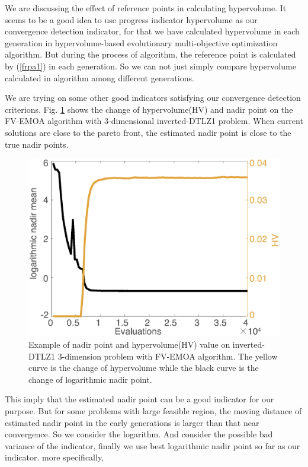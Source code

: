 \documentclass[conference]{IEEEtran}
\begin{document}
We are discussing the effect of reference points in calculating hypervolume. It seems to be a good
idea to use progress indicator hypervolume as our convergence detection indicator, 
for that we have calculated
hypervolume in each generation in hypervolume-based evolutionary multi-objective optimization algorithm.
But during the process of algorithm, the reference point is calculated by (\ref{frpa1}) 
in each generation.
So we can not just simply compare hypervolume calculated in algorithm among different generations. 

We are trying on some other good indicators satisfying our convergence detection criterions. 
Fig. \ref{wcd1} shows the change of hypervolume(HV) and nadir point on the FV-EMOA algorithm 
with 3-dimensional inverted-DTLZ1 problem.
When current solutions are close to the pareto front, the estimated nadir point is close 
to the true nadir points. 
\begin{figure}[!t]
  \centering
    \includegraphics[width=\columnwidth]{FVEMOA_IDTLZ1_M3_nadir_1}
  \caption{Example of nadir point and hypervolume(HV) value on inverted-DTLZ1 3-dimension problem
  with FV-EMOA algorithm.
  The yellow curve is the change of hypervolume 
  while the black curve is the change of logarithmic nadir point.
  }
  \label{wcd1}
\end{figure}
This imply that the estimated nadir point can be a good indicator for our purpose. 
But for some problems with large feasible region, 
the moving distance of estimated nadir point in the early generations is larger than that near convergence.
So we consider the logarithm. And consider the possible bad variance of the indicator, 
finally we use best logarithmic nadir point so far as our indicator. more specifically,
\end{document}
